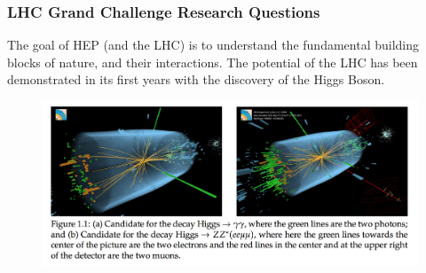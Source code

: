 \begin{frame}
\frametitle{LHC Grand Challenge Research Questions}

The goal of HEP (and the LHC) is to understand the fundamental building blocks of nature, and their interactions. The potential of the LHC has been demonstrated in its first years with the discovery of the Higgs Boson. \\
\vskip 0.15in
\begin{figure}[htbp]
\begin{center}
\includegraphics[width=1.0\textwidth]{images/cms-higgs-events.png}
\end{center}
\end{figure}

\end{frame}


